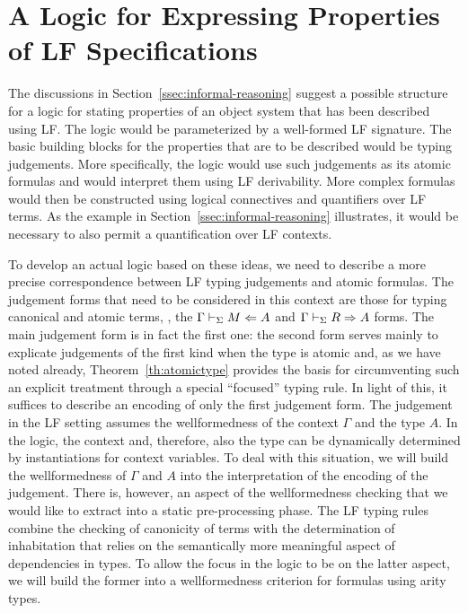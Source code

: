 \section{A Logic for Expressing Properties of LF Specifications}
\label{sec:logic}

The discussions in Section~\ref{ssec:informal-reasoning} suggest a 
possible structure for a logic for stating properties of an object
system that has been described using LF. 
%
The logic would be parameterized by a well-formed LF signature.
%
The basic building blocks for the properties that are to be described
would be typing judgements.
%
More specifically, the logic would use such judgements as its atomic
formulas and would interpret them using LF derivability.
%
More complex formulas would then be constructed using 
logical connectives and quantifiers over LF terms.
%
As the example in Section~\ref{ssec:informal-reasoning} illustrates,
it would be necessary to also permit a quantification over LF contexts.

To develop an actual logic based on these ideas, we need to describe a
more precise correspondence between LF typing judgements and atomic
formulas. 
%
The judgement forms that need to be considered in this context are
those for typing canonical and atomic terms, \ie, the
$\Gamma \vdash_{\Sigma} M\Leftarrow A$ and $\Gamma \vdash_{\Sigma} R\Rightarrow A$ forms. 
%
The main judgement form is in fact the first one: the second form
serves mainly to explicate judgements of the first kind when the type
is atomic and, as we have noted already, Theorem~\ref{th:atomictype}
provides the basis for circumventing such an explicit treatment
through a special ``focused'' typing rule. 
%
In light of this, it suffices to describe an encoding of only the
first judgement form.
%
The judgement in the LF setting assumes the wellformedness of the
context $\Gamma$ and the type $A$.
%
In the logic, the context and, therefore, also the type can be
dynamically determined by instantiations for context variables.
%
To deal with this situation, we will build the wellformedness of
$\Gamma$ and $A$ into the interpretation of the encoding of the
judgement. 
%
There is, however, an aspect of the wellformedness checking that we
would like to extract into a static pre-processing phase.
%
The LF typing rules combine the checking of canonicity of terms with
the determination of inhabitation that relies on the semantically more
meaningful aspect of dependencies in types.
%
To allow the focus in the logic to be on the latter aspect, we will
build the former into a wellformedness criterion for formulas using
arity types.

